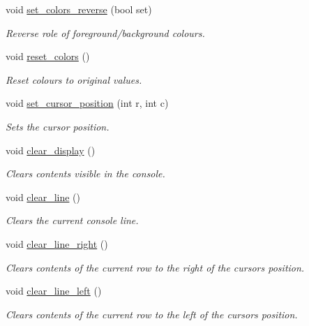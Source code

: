 \begin{DoxyCompactItemize}
void \hyperlink{classcpen333_1_1console_ae5cd5a356afeedd7f8cf96c2cbac3785}{set\+\_\+colors\+\_\+reverse} (bool set)
\begin{DoxyCompactList}\small\item\em Reverse role of foreground/background colours. \end{DoxyCompactList}\item 
void \hyperlink{classcpen333_1_1console_a20094148348d3cbb9e59ec0833fc6d3a}{reset\+\_\+colors} ()
\begin{DoxyCompactList}\small\item\em Reset colours to original values. \end{DoxyCompactList}\item 
void \hyperlink{classcpen333_1_1console_ad72d4364021db07a5cd7a8b7e2828182}{set\+\_\+cursor\+\_\+position} (int r, int c)
\begin{DoxyCompactList}\small\item\em Sets the cursor position. \end{DoxyCompactList}\item 
void \hyperlink{classcpen333_1_1console_a9be67402cba00113f607d3ec1c2d0f2c}{clear\+\_\+display} ()
\begin{DoxyCompactList}\small\item\em Clears contents visible in the console. \end{DoxyCompactList}\item 
void \hyperlink{classcpen333_1_1console_a34df62ef953db9403e25c10827decc4c}{clear\+\_\+line} ()
\begin{DoxyCompactList}\small\item\em Clears the current console line. \end{DoxyCompactList}\item 
void \hyperlink{classcpen333_1_1console_a36a1cf0fec4bab91d147e294f338c373}{clear\+\_\+line\+\_\+right} ()
\begin{DoxyCompactList}\small\item\em Clears contents of the current row to the right of the cursor\textquotesingle{}s position. \end{DoxyCompactList}\item 
void \hyperlink{classcpen333_1_1console_a66197024600f995776ce5d8428f6b3d1}{clear\+\_\+line\+\_\+left} ()
\begin{DoxyCompactList}\small\item\em Clears contents of the current row to the left of the cursor\textquotesingle{}s position. \end{DoxyCompactList}\item 

\end{DoxyCompactItemize}
